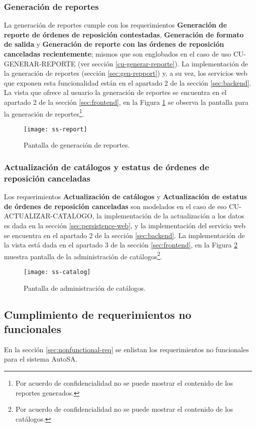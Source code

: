 \subsubsection{Generación de reportes}
La generación de reportes cumple con los requerimientos \textbf{Generación de reporte de órdenes de reposición contestadas}, \textbf{Generación de formato de salida} y \textbf{Generación de reporte con las órdenes de reposición canceladas recientemente}; mismos que son englobados en el caso de uso CU-GENERAR-REPORTE (ver sección \ref{cu-generar-reporte}). La implementación de la generación de reportes (sección \ref{sec:gen-repport}) y, a su vez, los servicios web que exponen esta funcionalidad están en el apartado 2 de la sección \ref{sec:backend}. La vista que ofrece al usuario la generación de reportes se encuentra en el apartado 2 de la sección \ref{sec:frontend}, en la Figura \ref{fig:ss-report} se observa la pantalla para la generación de reportes\footnote{Por acuerdo de confidencialidad no se puede mostrar el contenido de los reportes generados.}. 
	\begin{figure}[h]
		\centering
		\texttt{[image: ss-report]}
		\caption{Pantalla de generación de reportes.}
		\label{fig:ss-report}
	\end{figure}

\subsubsection{Actualización de catálogos y estatus de órdenes de reposición canceladas}
Los requerimientos \textbf{Actualización de catálogos} y \textbf{Actualización de estatus de órdenes de reposición canceladas} son modelados en el caso de eso CU-ACTUALIZAR-CATALOGO, la implementación de la actualización a los datos es dada en la sección \ref{sec:persistence-web}, y la implementación del servicio web se encuentra en el apartado 2 de la sección \ref{sec:backend}. La implementación de la vista está dada en el apartado 3 de la sección \ref{sec:frontend}, en la Figura \ref{fig:ss-catalog} muestra pantalla de la administración de catálogos\footnote{Por acuerdo de confidencialidad no se puede mostrar el contenido de los catálogos.}.
\begin{figure}[h]
	\centering
	\texttt{[image: ss-catalog]}
	\caption{Pantalla de administración de catálogos.}
	\label{fig:ss-catalog}
\end{figure}


\subsection{Cumplimiento de requerimientos no funcionales}
En la sección \ref{sec:nonfunctional-req} se enlistan los requerimientos no funcionales para el sistema AutoSA.

